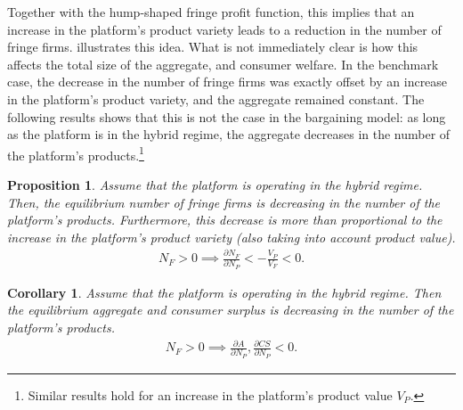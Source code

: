 \documentclass[a4paper]{article}
\newtheorem{proposition}{Proposition}
\newtheorem{corollary}{Corollary}
\begin{document}
Together with the hump-shaped fringe profit function, this implies that an increase in the platform's product variety leads to a reduction in the number of fringe firms.
 illustrates this idea.
What is not immediately clear is how this affects the total size of the aggregate, and consumer welfare.
In the benchmark case, the decrease in the number of fringe firms was exactly offset by an increase in the platform's product variety, and the aggregate remained constant.
The following results shows that this is not the case in the bargaining model: as long as the platform is in the hybrid regime, the aggregate decreases in the number of the platform's products.\footnote{
    Similar results hold for an increase in the platform's product value $V_P$.
}

\begin{proposition}
    \label{prop:N_F_comparative_equilibrium}
    Assume that the platform is operating in the hybrid regime. Then, the equilibrium number of fringe firms is decreasing in the number of the platform's products. Furthermore, this decrease is more than proportional to the increase in the platform's product variety (also taking into account product value).
    \begin{align*}
        N_F > 0 \implies \frac{\partial N_F}{\partial N_P} < -\frac{V_P}{V_F} < 0.
    \end{align*}
\end{proposition}

\begin{corollary}
    \label{prop:aggregate_comparative_hybrid}
    Assume that the platform is operating in the hybrid regime. Then the equilibrium aggregate and consumer surplus is decreasing in the number of the platform's products.
    \begin{align*}
        N_F > 0 \implies \frac{\partial A}{\partial N_P}, \frac{\partial CS}{\partial N_P} < 0.
    \end{align*}
\end{corollary}
\end{document}
